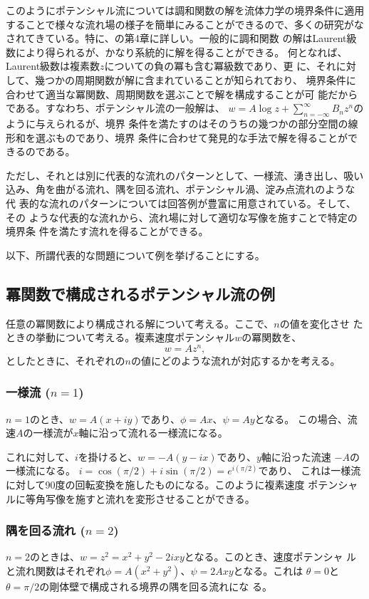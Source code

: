このようにポテンシャル流については調和関数の解を流体力学の境界条件に適用
することで様々な流れ場の様子を簡単にみることができるので、多くの研究がな
されてきている。特に、\cite[Lamb]{Lamb}の第4章に詳しい。一般的に調和関数
の解はLaurent級数により得られるが、かなり系統的に解を得ることができる。
何となれば、Laurent級数は複素数$z$についての負の冪も含む冪級数であり、更
に、それに対して、幾つかの周期関数が解に含まれていることが知られており、
境界条件に合わせて適当な冪関数、周期関数を選ぶことで解を構成することが可
能だからである。すなわち、ポテンシャル流の一般解は、
$w=A\log z + \sum_{n=-\infty}^{\infty}B_nz^n$のように与えられるが、境界
条件を満たすのはそのうちの幾つかの部分空間の線形和を選ぶものであり、境界
条件に合わせて発見的な手法で解を得ることができるのである。

ただし、それとは別に代表的な流れのパターンとして、一様流、湧き出し、吸い
込み、角を曲がる流れ、隅を回る流れ、ポテンシャル渦、淀み点流れのような代
表的な流れのパターンについては回答例が豊富に用意されている。そして、その
ような代表的な流れから、流れ場に対して適切な写像を施すことで特定の境界条
件を満たす流れを得ることができる。

以下、所謂代表的な問題について例を挙げることにする。

\subsection{冪関数で構成されるポテンシャル流の例}
任意の冪関数により構成される解について考える。ここで、$n$の値を変化させ
たときの挙動について考える。複素速度ポテンシャル$w$の冪関数を、
\begin{equation}
 w = Az^n,
\end{equation}
としたときに、それぞれの$n$の値にどのような流れが対応するかを考える。

\subsubsection{一様流 ($n=1$)}
$n=1$のとき、$w = A(x+iy)$であり、$\phi = Ax$、$\psi = Ay$となる。
この場合、流速$A$の一様流が$x$軸に沿って流れる一様流になる。

これに対して、$i$を掛けると、$w = -A(y - ix)$であり、$y$軸に沿った流速
$-A$の一様流になる。
$i=\cos (\pi/2) + i\sin (\pi / 2) = e^{i(\pi/2)}$であり、
これは一様流に対して90度の回転変換を施したものになる。このように複素速度
ポテンシャルに等角写像を施すと流れを変形させることができる。

\subsubsection{隅を回る流れ ($n=2$)}
$n=2$のときは、$w=z^2 = x^2+y^2 - 2ixy$となる。このとき、速度ポテンシャ
ルと流れ関数はそれぞれ$\phi = A(x^2 + y^2)$、$\psi = 2Axy$となる。これは
$\theta =0$と$\theta = \pi/2$の剛体壁で構成される境界の隅を回る流れにな
る。

